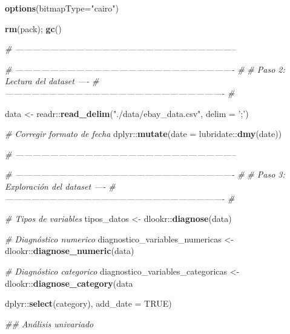 \documentclass[
  12pt]{article}
\newenvironment{Shaded}{}{}
\newcommand{\CommentTok}[1]{\textcolor[rgb]{0.38,0.63,0.69}{\textit{#1}}}
\newcommand{\DataTypeTok}[1]{\textcolor[rgb]{0.56,0.13,0.00}{#1}}
\newcommand{\KeywordTok}[1]{\textcolor[rgb]{0.00,0.44,0.13}{\textbf{#1}}}
\newcommand{\NormalTok}[1]{#1}
\newcommand{\OperatorTok}[1]{\textcolor[rgb]{0.40,0.40,0.40}{#1}}
\newcommand{\OtherTok}[1]{\textcolor[rgb]{0.00,0.44,0.13}{#1}}
\newcommand{\StringTok}[1]{\textcolor[rgb]{0.25,0.44,0.63}{#1}}
\begin{document}
\begin{Shaded}
\begin{Highlighting}[]
\KeywordTok{options}\NormalTok{(}\DataTypeTok{bitmapType=}\StringTok{"cairo"}\NormalTok{)}

\KeywordTok{rm}\NormalTok{(pack); }\KeywordTok{gc}\NormalTok{()}

\CommentTok{# -----------------------------------------------------------------------------}

\CommentTok{# ---------------------------------------------------------------------------- #}
\CommentTok{# Paso 2: Lectura del dataset ----}
\CommentTok{# ---------------------------------------------------------------------------- #}

\NormalTok{data <-}\StringTok{ }\NormalTok{readr}\OperatorTok{::}\KeywordTok{read_delim}\NormalTok{(}\StringTok{"./data/ebay_data.csv"}\NormalTok{, }\DataTypeTok{delim =} \StringTok{';'}\NormalTok{) }\OperatorTok{%>%}
\StringTok{  }\CommentTok{# Corregir formato de fecha }
\StringTok{  }\NormalTok{dplyr}\OperatorTok{::}\KeywordTok{mutate}\NormalTok{(}\DataTypeTok{date =}\NormalTok{ lubridate}\OperatorTok{::}\KeywordTok{dmy}\NormalTok{(date)) }

\CommentTok{# -----------------------------------------------------------------------------}

\CommentTok{# ---------------------------------------------------------------------------- #}
\CommentTok{# Paso 3: Exploración del dataset ----}
\CommentTok{# ---------------------------------------------------------------------------- #}

\CommentTok{# Tipos de variables}
\NormalTok{tipos_datos <-}\StringTok{ }\NormalTok{dlookr}\OperatorTok{::}\KeywordTok{diagnose}\NormalTok{(data)}

\CommentTok{# Diagnóstico numerico}
\NormalTok{diagnostico_variables_numericas <-}\StringTok{ }\NormalTok{dlookr}\OperatorTok{::}\KeywordTok{diagnose_numeric}\NormalTok{(data)}

\CommentTok{# Diagnóstico categorico}
\NormalTok{diagnostico_variables_categoricas <-}\StringTok{ }\NormalTok{dlookr}\OperatorTok{::}\KeywordTok{diagnose_category}\NormalTok{(data }\OperatorTok{%>%}
\StringTok{                                                                 }\NormalTok{dplyr}\OperatorTok{::}\KeywordTok{select}\NormalTok{(category), }\DataTypeTok{add_date =} \OtherTok{TRUE}\NormalTok{)}

  
\CommentTok{## Análisis univariado}

}}
\end{Highlighting}
\end{Shaded}
\end{document}
